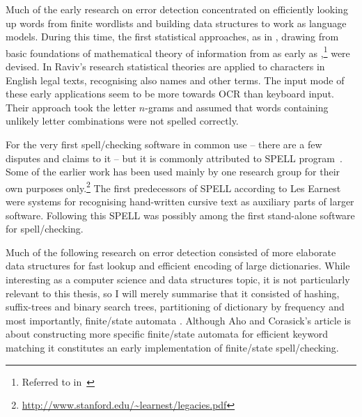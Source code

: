 \documentclass[officiallayout,final]{unihelcompling}
\begin{document}
Much of the early research on error detection
concentrated on efficiently looking up words from finite wordlists and
building data structures to work as \glspl{language model}. During this time,
the first statistical approaches, as in \citet{raviv1967decision}, drawing
from basic foundations of mathematical theory of information from as early as
\citet{shannon1948mathematical},\footnote{Referred to 
in~\citet{liberman2012noisily}} were devised. In
Raviv's research statistical theories are applied to characters in English
legal texts, recognising also names and other terms. The input mode of these
early applications seem to be more towards OCR than keyboard input. Their
approach took the letter \(n\)-grams and assumed that words containing unlikely
letter combinations were not spelled correctly.

For the very first spell\-/checking software in common use -- there are a few
disputes and claims to it -- but it is commonly attributed to SPELL
program~\citep{gorin1971spell}.  Some of the earlier work has been used mainly
by one research group for their own purposes
only.\footnote{\url{http://www.stanford.edu/~learnest/legacies.pdf}} The first
predecessors of SPELL according to Les Earnest were systems for recognising
hand-written cursive text as auxiliary parts of larger software. Following this
SPELL was possibly among the first stand-alone software for spell\-/checking.


Much of the following research on error detection consisted of more elaborate
data structures for fast lookup and efficient encoding of large dictionaries.
While interesting as a computer science and data structures topic, it is not
particularly relevant to this thesis, so I will merely summarise that it
consisted of hashing, suffix-trees and binary search trees, partitioning of
dictionary by frequency \citep{knuth1973art} and most importantly,
finite\-/state automata \citep{aho1975efficient}. Although Aho and Corasick's
article is about constructing more specific finite\-/state automata for
efficient keyword matching it constitutes an early implementation of
finite\-/state spell\-/checking.
\end{document}
